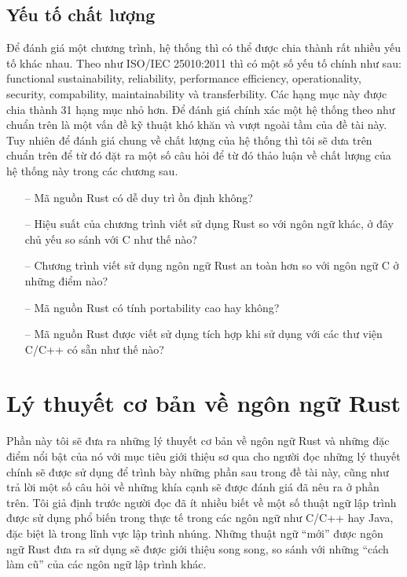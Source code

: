 \subsection{Yếu tố chất lượng}
Để đánh giá một chương trình, hệ thống thì có thể được chia thành rất nhiều yếu tố khác nhau.
Theo như ISO/IEC 25010:2011 thì có một số yếu tố chính như sau: functional sustainability, reliability, performance efficiency, operationality, security, compability, maintainability và transferbility. Các hạng mục này được chia thành 31 hạng mục nhỏ hơn.
Để đánh giá chính xác một hệ thống theo như chuẩn trên là một vấn đề kỹ thuật khó khăn và vượt ngoài tầm của đề tài này.
Tuy nhiên để đánh giá chung về chất lượng của hệ thống thì tôi sẽ dưa trên chuẩn trên để từ đó đặt ra một số câu hỏi để từ đó thảo luận về chất lượng của hệ thống này trong các chương sau.
\begin{itemize}
    \item[--] Mã nguồn Rust có dễ duy trì ồn định không?
    \item[--] Hiệu suất của chương trình viết sử dụng Rust so với ngôn ngữ khác, ở đây chủ yếu so sánh với C như thế nào?
    \item[--] Chương trình viết sử dụng ngôn ngữ Rust an toàn hơn so với ngôn ngữ C ở những điểm nào?
    \item[--] Mã nguồn Rust có tính portability cao hay không?
    \item[--] Mã nguồn Rust được viết sử dụng tích hợp khi sử dụng với các thư viện C/C++ có sẵn như thế nào?
\end{itemize}

\section{Lý thuyết cơ bản về ngôn ngữ Rust}
Phần này tôi sẽ đưa ra những lý thuyết cơ bản về ngôn ngữ Rust và những đặc điểm nổi bật của nó với mục tiêu giới thiệu sơ qua cho người đọc những lý thuyết chính sẽ được sử dụng để trình bày những phần sau trong đề tài này, cũng như trả lời một số câu hỏi về những khía cạnh sẽ được đánh giá đã nêu ra ở phần trên.
Tôi giả định trước người đọc đã ít nhiều biết về một số thuật ngữ lập trình được sử dụng phổ biến trong thực tế trong các ngôn ngữ như C/C++ hay Java, đặc biệt là trong lĩnh vực lập trình nhúng.
Những thuật ngữ ``mới'' được ngôn ngữ Rust đưa ra sử dụng sẽ được giới thiệu song song, so sánh với những ``cách làm cũ'' của các ngôn ngữ lập trình khác.


